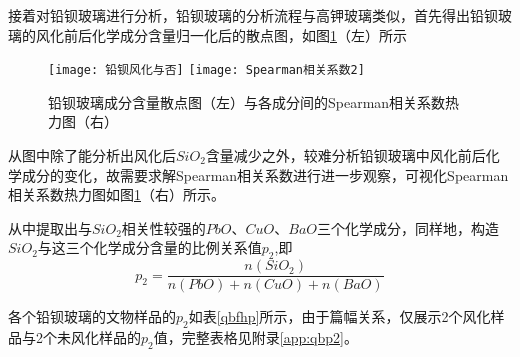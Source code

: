 \documentclass[withoutpreface,bwprint]{cumcmthesis} %
\begin{document}
接着对铅钡玻璃进行分析，铅钡玻璃的分析流程与高钾玻璃类似，首先得出铅钡玻璃的风化前后化学成分含量归一化后的散点图，如图\ref{qbfh}（左）所示


\begin{figure}[!h]
	\centering
	\texttt{[image: 铅钡风化与否]}
	\texttt{[image: Spearman相关系数2]}
	\caption{铅钡玻璃成分含量散点图（左）与各成分间的Spearman相关系数热力图（右）}
	\label{qbfh}
\end{figure}


从图中除了能分析出风化后$SiO_{2}$含量减少之外，较难分析铅钡玻璃中风化前后化学成分的变化，故需要求解Spearman相关系数进行进一步观察，可视化Spearman相关系数热力图如图\ref{qbfh}（右）所示。


从中提取出与$SiO_{2}$相关性较强的$PbO$、$CuO$、$BaO$三个化学成分，同样地，构造$SiO_{2}$与这三个化学成分含量的比例关系值$p_{2}$,即 $$p_{2}=\frac{n(SiO_{2})}{n(PbO)+n(CuO)+n(BaO)}$$


各个铅钡玻璃的文物样品的$p_{2}$如表\ref{qbfhp}所示，由于篇幅关系，仅展示2个风化样品与2个未风化样品的$p_{2}$值，完整表格见附录\ref{app:qbp2}。
\end{document}
